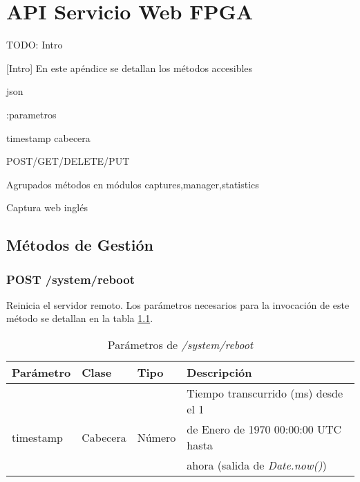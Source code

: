 \chapter{API Servicio Web FPGA\label{extra:api_servicio_web_fpga}}

TODO: Intro

[Intro] En este apéndice se detallan los métodos accesibles 

json

:parametros

timestamp cabecera

POST/GET/DELETE/PUT


Agrupados métodos en módulos {captures,manager,statistics}

Captura web inglés

\section{Métodos de Gestión \label{extra:api:gestion}}

%
%
\subsection{POST /system/reboot}

Reinicia el servidor remoto. Los parámetros necesarios para la invocación de este método se detallan en la tabla \ref{extra:api:reboot:invocacion}.

\begin{table}[H]
\centering
\begin{tabular}{|l|l|l|l|}
\hline
\rowcolor[HTML]{F5F5F5}
\textbf{Parámetro}  & \textbf{Clase} & \textbf{Tipo} & \textbf{Descripción}                  \\ \hline
                    &                &               & Tiempo transcurrido (ms) desde el 1   \\
timestamp           & Cabecera       & Número        & de Enero de 1970 00:00:00 UTC hasta   \\
                    &                &               & ahora (salida de \textit{Date.now()}) \\ \hline
\end{tabular}
\caption{Parámetros de \textit{/system/reboot}}
\label{extra:api:reboot:invocacion}
\end{table}

